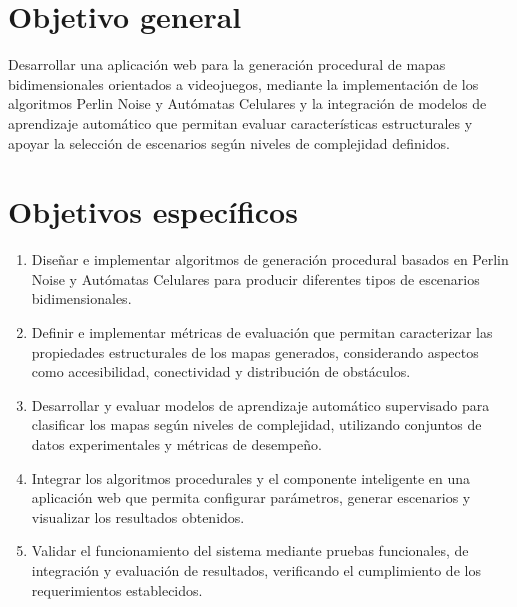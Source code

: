 
\section{Objetivo general}

Desarrollar una aplicación web para la generación procedural de mapas bidimensionales orientados a videojuegos, mediante la implementación de los algoritmos Perlin Noise y Autómatas Celulares y la integración de modelos de aprendizaje automático que permitan evaluar características estructurales y apoyar la selección de escenarios según niveles de complejidad definidos.


\section{Objetivos específicos}

\begin{enumerate}

    \item Diseñar e implementar algoritmos de generación procedural basados en Perlin Noise y Autómatas Celulares para producir diferentes tipos de escenarios bidimensionales.
    
    \item Definir e implementar métricas de evaluación que permitan caracterizar las propiedades estructurales de los mapas generados, considerando aspectos como accesibilidad, conectividad y distribución de obstáculos.
    
    \item Desarrollar y evaluar modelos de aprendizaje automático supervisado para clasificar los mapas según niveles de complejidad, utilizando conjuntos de datos experimentales y métricas de desempeño.

    \item Integrar los algoritmos procedurales y el componente inteligente en una aplicación web que permita configurar parámetros, generar escenarios y visualizar los resultados obtenidos.

    \item Validar el funcionamiento del sistema mediante pruebas funcionales, de integración y evaluación de resultados,     verificando el cumplimiento de los requerimientos establecidos.
    
\end{enumerate}

